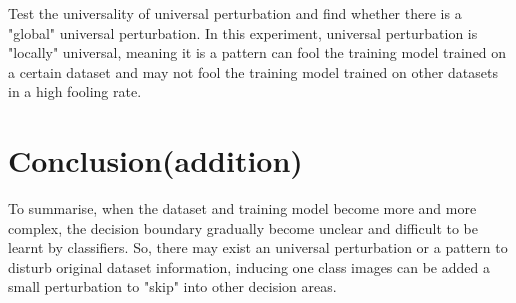 \documentclass{article}
\begin{document}
Test the universality of universal perturbation and find whether there is a "global" universal perturbation. In this experiment, universal perturbation is "locally" universal, meaning it is a pattern can fool the training model trained on a certain dataset and may not fool the training model trained on other datasets in a high fooling rate.

\section{Conclusion(addition)}
To summarise, when the dataset and training model become more and more complex, the decision boundary gradually become unclear and difficult to be learnt by classifiers. So, there may exist an universal perturbation or a pattern to disturb original dataset information, inducing one class images can be added a small perturbation to "skip" into other decision areas.

\medskip



\end{document}

